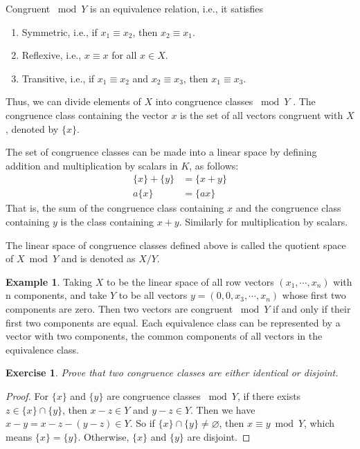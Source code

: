 \documentclass[11pt]{book}
\newtheorem{exercise}{Exercise}[section]
\theoremstyle{definition}
\newtheorem{example}{Example}[section]
\numberwithin{equation}{chapter}
\begin{document}
Congruent $\bmod Y$ is an equivalence relation, i.e., it satisfies
\begin{enumerate}[label=(\arabic*)]
    \item Symmetric, i.e., if $x_1\equiv x_2$, then $x_2\equiv x_1$.
    \item Reflexive, i.e., $x\equiv x$ for all $x\in X$.
    \item Transitive, i.e., if $x_1\equiv x_2$ and $x_2\equiv x_3$, then $x_1\equiv x_3$.
\end{enumerate}
Thus, we can divide elements of $X$ into congruence classes $\bmod Y$ . The congruence class containing the vector $x$ is the set of all vectors congruent with $X$, denoted by $\{x\}$.

The set of congruence classes can be made into a linear space by defining addition and multiplication by scalars in $K$, as follows:
\begin{align*}
    \{x\} + \{y\}& = \{x+y\}\\
    a\{x\} &= \{ax\}
\end{align*}
That is, the sum of the congruence class containing $x$ and the congruence class containing $y$ is the class containing $x + y$. Similarly for multiplication by scalars.

The linear space of congruence classes defined above is called the quotient space of $X \bmod Y$ and is denoted as $X/Y$. 

\medskip

\begin{example}
Taking $X$ to be the linear space of all row vectors $(x_1,\cdots, x_n)$ with n components, and take $Y$ to be all vectors $y = (0, 0, x_3,\cdots, x_n) $ whose first two components are zero. Then two vectors are congruent $\bmod Y$ if and only if their first two components are equal. Each equivalence class can be represented by a vector with two components, the common components of all vectors in the equivalence class. 
\end{example}

\medskip

\begin{exercise}
Prove that two congruence classes are either identical or disjoint. 
\end{exercise}
\begin{proof}
For $\{x\}$ and $\{y\}$ are congruence classes $\bmod Y$, if there exists $z\in \{x\}\cap \{y\}$, then $x-z \in Y$ and $y-z\in Y$. Then we have $x-y = x-z-(y-z) \in Y$. So if $\{x\}\cap \{y\}\neq \varnothing$, then $x\equiv y \bmod Y$, which means $\{x\} = \{y\}$. Otherwise, $\{x\}$ and $\{y\}$ are disjoint.
\end{proof}
\end{document}
